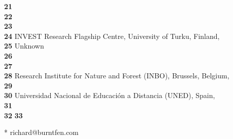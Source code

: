 \textbf{21} \\
\textbf{22} \\
\textbf{23} \\
\textbf{24} INVEST Research Flagship Centre, University of Turku, Finland, \\
\textbf{25} Unknown\\
\textbf{26} \\
\textbf{27} \\
\textbf{28} Research Institute for Nature and Forest (INBO), Brussels, Belgium, \\
\textbf{29} \\
\textbf{30} Universidad Nacional de Educación a Distancia (UNED), Spain, \\
\textbf{31} \\
\textbf{32} 
\textbf{33} 

* richard@burntfen.com
